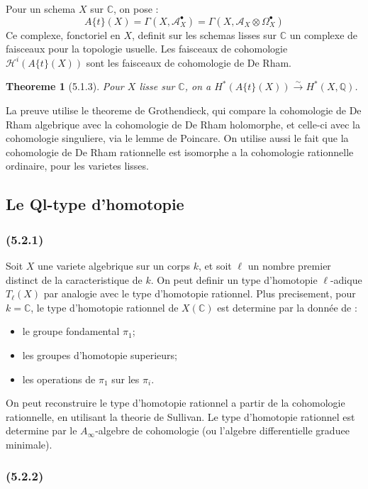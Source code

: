 \documentclass[12pt,a4paper]{article}
\theoremstyle{plain}
\newtheorem{theorem}{Theoreme}[section]
\theoremstyle{definition}
\theoremstyle{remark}
\newcommand{\bbQ}{\mathbb{Q}}
\newcommand{\bbC}{\mathbb{C}}
\newcommand{\scrH}{\mathscr{H}}
\newcommand{\scrA}{\mathscr{A}}
\newcommand{\At}{A\{t\}}
\begin{document}
Pour un schema $X$ sur $\bbC$, on pose :
\[
\At(X) = \Gamma(X, \scrA_X^\bullet) = \Gamma(X, \scrA_X \otimes \Omega_X^\bullet)
\]
Ce complexe, fonctoriel en $X$, definit sur les schemas lisses sur $\bbC$ un complexe de faisceaux pour la topologie usuelle. Les faisceaux de cohomologie $\scrH^i(\At(X))$ sont les faisceaux de cohomologie de De Rham.

\begin{theorem}[5.1.3]
Pour $X$ lisse sur $\bbC$, on a $H^*(\At(X)) \xrightarrow{\sim} H^*(X, \bbQ)$.
\end{theorem}

La preuve utilise le theoreme de Grothendieck, qui compare la cohomologie de De Rham algebrique avec la cohomologie de De Rham holomorphe, et celle-ci avec la cohomologie singuliere, via le lemme de Poincare. On utilise aussi le fait que la cohomologie de De Rham rationnelle est isomorphe a la cohomologie rationnelle ordinaire, pour les varietes lisses.

\subsection{Le Ql-type d'homotopie}

\subsubsection*{\textup{(5.2.1)}}

Soit $X$ une variete algebrique sur un corps $k$, et soit $\ell$ un nombre premier distinct de la caracteristique de $k$. On peut definir un type d'homotopie $\ell$-adique $T_\ell(X)$ par analogie avec le type d'homotopie rationnel. Plus precisement, pour $k = \bbC$, le type d'homotopie rationnel de $X(\bbC)$ est determine par la donnée de :
\begin{itemize}
\item[(i)] le groupe fondamental $\pi_1$;
\item[(ii)] les groupes d'homotopie superieurs;
\item[(iii)] les operations de $\pi_1$ sur les $\pi_i$.
\end{itemize}

On peut reconstruire le type d'homotopie rationnel a partir de la cohomologie rationnelle, en utilisant la theorie de Sullivan. Le type d'homotopie rationnel est determine par le $A_\infty$-algebre de cohomologie (ou l'algebre differentielle graduee minimale).

\subsubsection*{\textup{(5.2.2)}}
\end{document}

